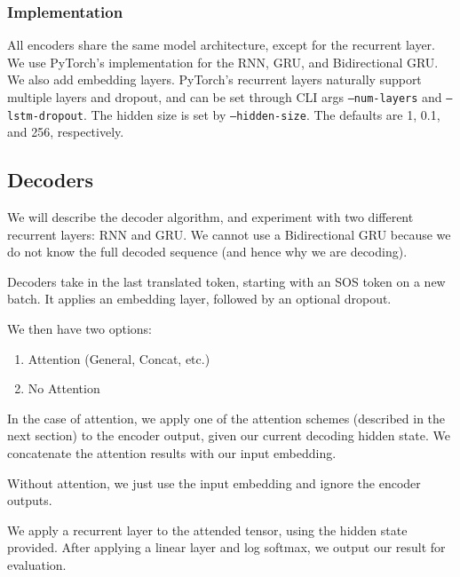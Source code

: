 \documentclass[twoside,twocolumn]{article}
\begin{document}
\subsubsection{Implementation}
All encoders share the same model architecture, except for the recurrent layer.
We use PyTorch's implementation for the RNN, GRU, and Bidirectional GRU.
We also add embedding layers. PyTorch's recurrent layers naturally support
multiple layers and dropout, and can be set through CLI args
\texttt{--num-layers} and \texttt{--lstm-dropout}. The hidden size is set by
\texttt{--hidden-size}. The defaults are 1, 0.1, and 256, respectively.


\subsection{Decoders}
We will describe the decoder algorithm, and experiment with two different
recurrent layers: RNN and GRU. We cannot use a Bidirectional GRU because
we do not know the full decoded sequence (and hence why we are decoding).

Decoders take in the last translated token, starting with an SOS token on a
new batch. It applies an embedding layer, followed by an optional dropout.

We then have two options:
\begin{enumerate}
  \item Attention (General, Concat, etc.)
  \item No Attention
\end{enumerate}
In the case of attention, we apply one of the attention schemes (described in
the next section) to the encoder output, given our current decoding
hidden state. We concatenate the attention results with our input embedding.

Without attention, we just use the input embedding and ignore the encoder
outputs.

We apply a recurrent layer to the attended tensor, using the hidden state
provided. After applying a linear layer and log softmax, we output our result
for evaluation.
\end{document}

